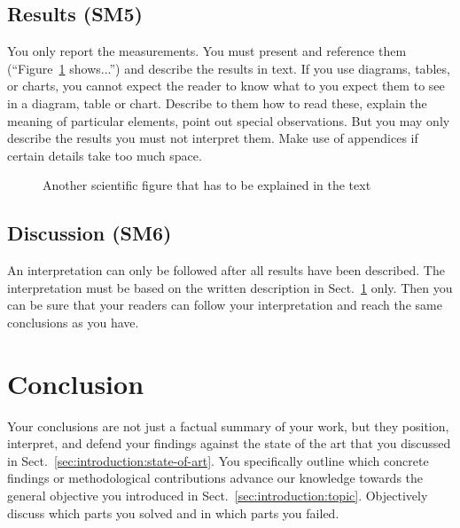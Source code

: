 \documentclass[12pt,a4paper,footinclude=true,twoside,headinclude=true]{report}
\begin{document}
\section{Results (SM5)}\label{sec:evaluation:results}

You only report the measurements. You must present and reference them (``Figure~\ref{fig:my_label2} shows...'') and describe the results in text. If you use diagrams, tables, or charts, you cannot expect the reader to know what to you expect them to see in a diagram, table or chart. Describe to them how to read these, explain the meaning of particular elements, point out special observations. But you may only describe the results you must not interpret them. Make use of appendices if certain details take too much space.

\begin{figure}
    \centering
    \caption{Another scientific figure that has to be explained in the text}
    \label{fig:my_label2}
\end{figure}

\section{Discussion (SM6)}\label{sec:evaluation:discussion}

An interpretation can only be followed after all results have been described. The interpretation must be based on the written description in Sect.~\ref{sec:evaluation:results} only. Then you can be sure that your readers can follow your interpretation and reach the same conclusions as you have.

\chapter{Conclusion}\label{sec:conclusion}

Your conclusions are not just a factual summary of your work, but they position, interpret, and defend your findings against the state of the art that you discussed in Sect.~\ref{sec:introduction:state-of-art}. You specifically outline which concrete findings or methodological contributions advance our knowledge towards the general objective you introduced in Sect.~\ref{sec:introduction:topic}. Objectively discuss which parts you solved and in which parts you failed.
\end{document}
